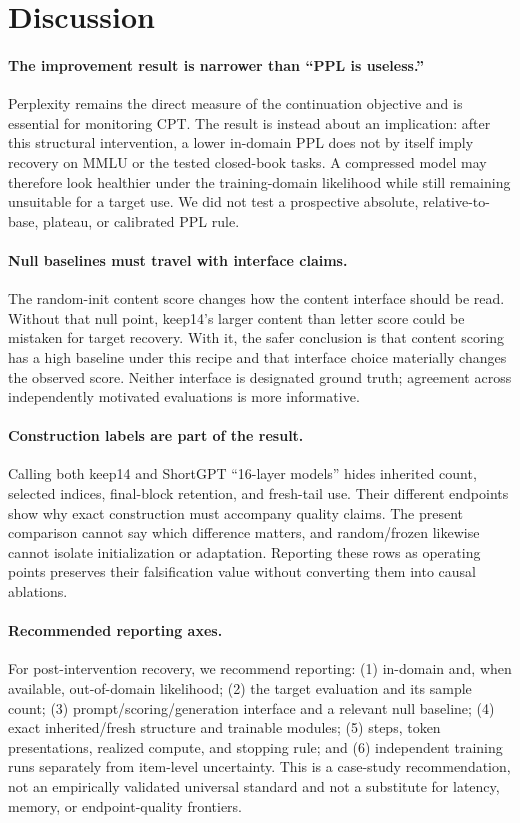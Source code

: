 \section{Discussion}
\label{sec:discussion}

\paragraph{The improvement result is narrower than ``PPL is useless.''}
Perplexity remains the direct measure of the continuation objective and is
essential for monitoring CPT. The result is instead about an implication:
after this structural intervention, a lower in-domain PPL does not by itself
imply recovery on MMLU or the tested closed-book tasks. A compressed model may
therefore look healthier under the training-domain likelihood while still
remaining unsuitable for a target use. We did not test a prospective absolute,
relative-to-base, plateau, or calibrated PPL rule.

\paragraph{Null baselines must travel with interface claims.}
The random-init content score changes how the content interface should be read.
Without that null point, keep14's larger content than letter score could be
mistaken for target recovery. With it, the safer conclusion is that content
scoring has a high baseline under this recipe and that interface choice
materially changes the observed score. Neither interface is designated ground
truth; agreement across independently motivated evaluations is more
informative.

\paragraph{Construction labels are part of the result.}
Calling both keep14 and ShortGPT ``16-layer models'' hides inherited count,
selected indices, final-block retention, and fresh-tail use. Their different
endpoints show why exact construction must accompany quality claims. The
present comparison cannot say which difference matters, and random/frozen
likewise cannot isolate initialization or adaptation. Reporting these rows as
operating points preserves their falsification value without converting them
into causal ablations.

\paragraph{Recommended reporting axes.}
For post-intervention recovery, we recommend reporting:
(1) in-domain and, when available, out-of-domain likelihood;
(2) the target evaluation and its sample count;
(3) prompt/scoring/generation interface and a relevant null baseline;
(4) exact inherited/fresh structure and trainable modules;
(5) steps, token presentations, realized compute, and stopping rule; and
(6) independent training runs separately from item-level uncertainty.
This is a case-study recommendation, not an empirically validated universal
standard and not a substitute for latency, memory, or endpoint-quality
frontiers.
